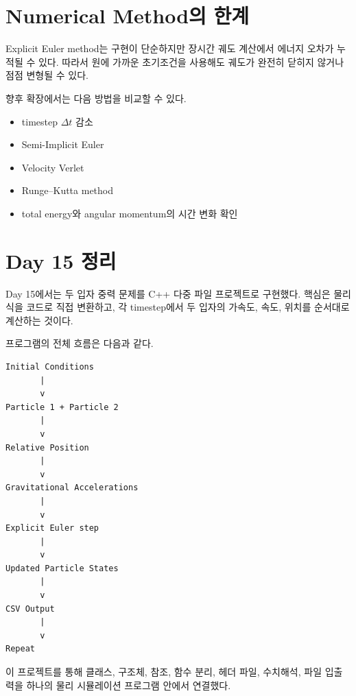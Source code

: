 \documentclass[11pt,a4paper]{article}
\begin{document}
\section{Numerical Method의 한계}
Explicit Euler method는 구현이 단순하지만 장시간 궤도 계산에서 에너지 오차가 누적될 수 있다.
따라서 원에 가까운 초기조건을 사용해도 궤도가 완전히 닫히지 않거나 점점 변형될 수 있다.

향후 확장에서는 다음 방법을 비교할 수 있다.
\begin{itemize}[leftmargin=1.5em]
    \item timestep $\Delta t$ 감소
    \item Semi-Implicit Euler
    \item Velocity Verlet
    \item Runge--Kutta method
    \item total energy와 angular momentum의 시간 변화 확인
\end{itemize}

\section{Day 15 정리}
Day 15에서는 두 입자 중력 문제를 C++ 다중 파일 프로젝트로 구현했다.
핵심은 물리식을 코드로 직접 변환하고, 각 timestep에서 두 입자의 가속도, 속도, 위치를 순서대로 계산하는 것이다.

프로그램의 전체 흐름은 다음과 같다.

\begin{verbatim}
Initial Conditions
       |
       v
Particle 1 + Particle 2
       |
       v
Relative Position
       |
       v
Gravitational Accelerations
       |
       v
Explicit Euler step
       |
       v
Updated Particle States
       |
       v
CSV Output
       |
       v
Repeat
\end{verbatim}

이 프로젝트를 통해 클래스, 구조체, 참조, 함수 분리, 헤더 파일, 수치해석, 파일 입출력을 하나의 물리 시뮬레이션 프로그램 안에서 연결했다.
\end{document}

